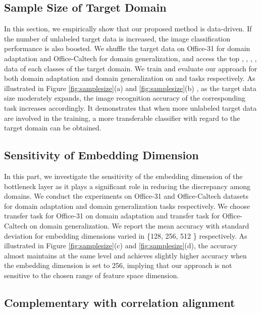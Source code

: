 \documentclass[review]{elsarticle}
\begin{document}
\subsection{Sample Size of Target Domain}

In this section, we empirically show that our proposed method is data-driven. If the number of unlabeled target data is increased, the image classification performance is also boosted. We shuffle the target data on Office-31 for domain adaptation and Office-Caltech for domain generalization, and access the top , , , ,  data of each classes of the target domain. We train and evaluate our approach for both domain adaptation and domain generalization on    and    tasks respectively. As illustrated in Figure \ref{fig:samplesize}(a) and \ref{fig:samplesize}(b) , as the target data size moderately expands, the image recognition accuracy of the corresponding task increases accordingly. It demonstrates that when more unlabeled target data are involved in the training, a more transferable classifier with regard
to the target domain can be obtained.  


\subsection{Sensitivity of Embedding Dimension}

In this part, we investigate the sensitivity of the embedding dimension of the bottleneck layer as it plays a significant role in reducing the discrepancy among domains. We conduct the experiments on  Office-31 and Office-Caltech datasets for domain adaptation and domain generalization tasks respectively.
We choose    transfer task for Office-31 on domain adaptation and    transfer task for Office-Caltech on domain generalization. We report the mean accuracy
with standard deviation for embedding dimensions varied
in \{128, 256, 512 \} respectively. As illustrated
in Figure \ref{fig:samplesize}(c) and \ref{fig:samplesize}(d), the accuracy almost maintains at the same level
and achieves slightly higher accuracy when the embedding dimension
is set to 256, implying that our approach is not sensitive
to the chosen range of feature space dimension.





\subsection{Complementary with correlation alignment}
\end{document}
